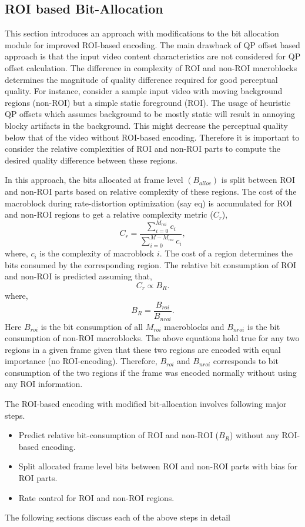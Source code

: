 \documentclass[11pt]{article} %
\begin{document}
\subsection{ROI based Bit-Allocation}
This section introduces an approach with modifications to the bit allocation module for improved ROI-based encoding. The main drawback of QP offset based approach is that the input video content characteristics are not considered for QP offset calculation. The difference in complexity of ROI and non-ROI macroblocks determines the magnitude of quality difference required for good perceptual quality. For instance, consider a sample input video with moving background regions (non-ROI) but a simple static foreground (ROI). The usage of heuristic QP offsets which assumes background to be mostly static will result in annoying blocky artifacts in the background. This might decrease the perceptual quality below that of the video without ROI-based encoding. Therefore it is important to consider the relative complexities of ROI and non-ROI parts to compute the desired quality difference between these regions.

In this approach, the bits allocated at frame level $(B_{alloc})$ is split between ROI and non-ROI parts based on relative complexity of these regions. The cost of the macroblock during rate-distortion optimization (say eq) is accumulated for ROI and non-ROI regions to get a relative complexity metric ($C_r$),
$$C_r = \frac{\sum_{i =0}^{M_{roi}}{c_i}}{\sum_{i =0}^{M-M_{roi}}{c_i}},$$
where, $c_i$ is the complexity of macroblock $i$. The cost of a region determines the bits consumed by the corresponding region. The relative bit consumption of ROI and non-ROI is predicted assuming that,
\begin{equation}
\label{Eq:Relative bit consumption}
	C_r \propto B_R.
\end{equation}
where, $$B_R = \frac{B_{roi}}{B_{nroi}}.$$
Here $B_{roi}$ is the bit consumption of all $M_{roi}$ macroblocks and $B_{nroi}$ is the bit consumption of non-ROI macroblocks. The above equations hold true for any two regions in a given frame given that these two regions are encoded with equal importance (no ROI-encoding). Therefore, $B_{roi}$ and $B_{nroi}$ corresponds to bit consumption of the two regions if the frame was encoded normally without using any ROI information.
 
The ROI-based encoding with modified bit-allocation involves following major steps.
\begin{itemize}
	\item Predict relative bit-consumption of ROI and non-ROI ($B_R$) without any ROI-based encoding.
	\item Split allocated frame level bits between ROI and non-ROI parts with bias for ROI parts.
	\item Rate control for ROI and non-ROI regions.
\end{itemize}
The following sections discuss each of the above steps in detail
\end{document}
